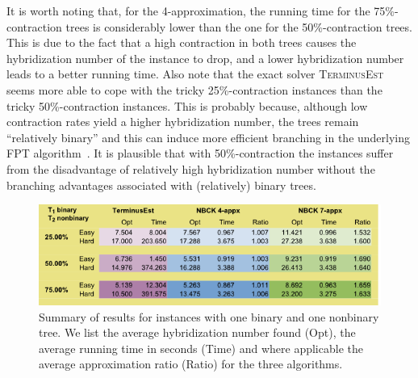 
It is worth noting that, for the 4-approximation, the running time for the 75\%-contraction trees is considerably lower than the one for the 50\%-contraction trees. This is due to the fact that a high contraction in both trees causes the hybridization number of the instance to drop, and a lower hybridization number leads to a better running time. 
Also note that the exact solver \textsc{TerminusEst} seems more able to cope with the
tricky 25\%-contraction instances than the tricky 50\%-contraction instances. This is probably because, although low contraction rates yield a higher hybridization number, the trees remain ``relatively binary'' and this can induce more efficient branching in the underlying FPT algorithm~\cite{teresaFPT}. It is plausible that with 50\%-contraction the instances suffer from the disadvantage of relatively high hybridization number without the branching advantages associated with (relatively) binary trees.

% 
% 


\begin{figure}[h]
	\centering
		\includegraphics[width=\textwidth]{../figs/table1.png}
	\caption{Summary of results for instances with one binary and one nonbinary tree. We list the average hybridization number found (Opt), the average running time in seconds (Time) and where applicable the average approximation ratio (Ratio) for the three algorithms.}
	\label{fig:rspr_for_maf}
\end{figure}


